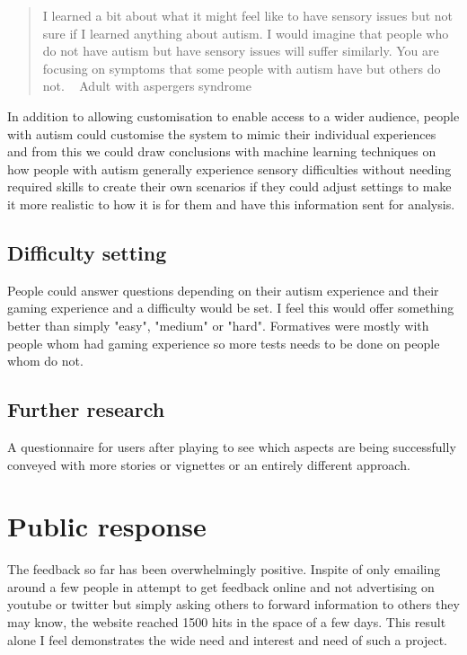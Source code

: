 \documentclass[11pt]{report}
\begin{document}
\begin{quote}
I learned a bit about what it might feel like to have sensory issues but not sure if I learned anything about autism. I would imagine that people who do not have autism but have sensory issues will suffer similarly. You are focusing on symptoms that some people with autism have but others do not. ~ Adult with aspergers syndrome
\end{quote}

In addition to allowing customisation to enable access to a wider audience, people with autism could customise the system to mimic their individual experiences and from this we could draw conclusions with machine learning techniques on how people with autism generally experience sensory difficulties without needing required skills to create their own scenarios if they could adjust settings to make it more realistic to how it is for them and have this information sent for analysis.

\subsection{Difficulty setting}
People could answer questions depending on their autism experience and their gaming experience and a difficulty would be set. I feel this would offer something better than simply "easy", "medium" or "hard". Formatives were mostly with people whom had gaming experience so more tests needs to be done on people whom do not.

\subsection{Further research}
A questionnaire for users after playing to see which aspects are being successfully conveyed with more stories or vignettes or an entirely different approach. 


\section{Public response}
\label{sec:publicresponse}
The feedback so far has been overwhelmingly positive. Inspite of only emailing around a few people in attempt to get feedback online and not advertising on youtube or twitter but simply asking others to forward information to others they may know, the website reached 1500 hits in the space of a few days. This result alone I feel demonstrates the wide need and interest and need of such a project. 
\end{document}
